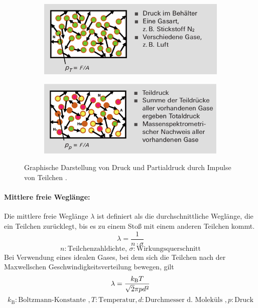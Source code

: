 \begin{figure}
  \centering
  \begin{subfigure}[b]{0.48\textwidth}
    \centering
    \includegraphics[width=\textwidth]{Druck.png}
  \end{subfigure}
  \begin{subfigure}[b]{0.49\textwidth}
    \centering
    \includegraphics[width=\textwidth]{Partialdruck.png}
  \end{subfigure}
  \caption{Graphische Darstellung von Druck und Partialdruck durch Impulse von Teilchen \cite{pfeiffer}.}
  \label{fig:Druck}
\end{figure}

\paragraph{Mittlere freie Weglänge:}
Die mittlere freie Weglänge $\lambda$ ist definiert als die durchschnittliche Weglänge, die
ein Teilchen zurücklegt, bis es zu einem Stoß mit einem anderen Teilchen kommt.
\begin{equation}
  \lambda = \frac{1}{n\cdot\sigma}
  \label{eqn:Weglaenge}
\end{equation}
\begin{equation*}
  n:\text{Teilchenzahldichte, } \sigma:\text{Wirkungsquerschnitt}
\end{equation*}
Bei Verwendung eines idealen Gases, bei dem sich die Teilchen nach der Maxwellschen Geschwindigkeitsverteilung
bewegen, gilt
\begin{equation}
  \lambda = \frac{k_\text{B}T}{\sqrt{2}\pi p d^2} \\
\end{equation}
\begin{equation*}
  k_\text{B}:\text{Boltzmann-Konstante }, T:\text{Temperatur}, d:\text{Durchmesser d. Moleküls }, p:\text{Druck}
\end{equation*}
